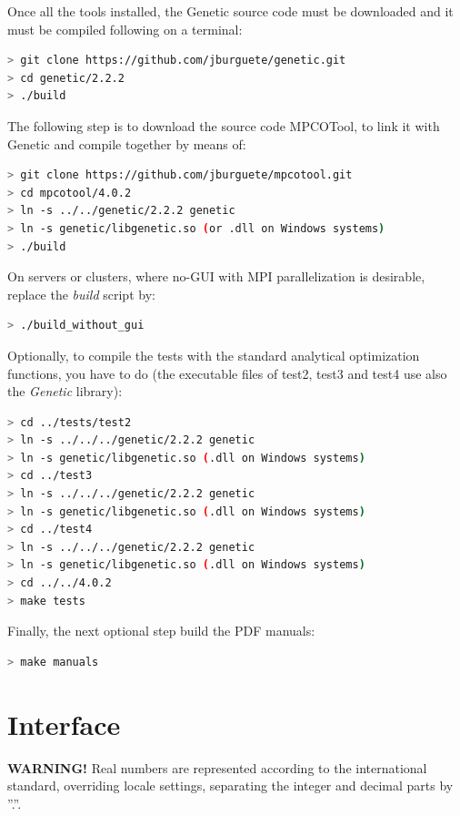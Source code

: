 \documentclass[a4paper]{report}
\begin{document}
Once all the tools installed, the Genetic source code must be downloaded and it must be compiled following on a terminal:
\begin{lstlisting}[language=bash,basicstyle=\scriptsize]
> git clone https://github.com/jburguete/genetic.git
> cd genetic/2.2.2
> ./build
\end{lstlisting}

The following step is to download the source code MPCOTool, to link it with Genetic and compile together by means of:
\begin{lstlisting}[language=bash,basicstyle=\scriptsize]
> git clone https://github.com/jburguete/mpcotool.git
> cd mpcotool/4.0.2
> ln -s ../../genetic/2.2.2 genetic
> ln -s genetic/libgenetic.so (or .dll on Windows systems)
> ./build
\end{lstlisting}

On servers or clusters, where no-GUI with MPI parallelization is desirable,
replace the \emph{build} script by:
\begin{lstlisting}[language=bash,basicstyle=\scriptsize]
> ./build_without_gui
\end{lstlisting}
 
Optionally, to compile the tests with the standard analytical optimization
functions, you have to do (the executable files of test2, test3 and test4 use
also the \emph{Genetic} library):
\begin{lstlisting}[language=bash,basicstyle=\scriptsize]
> cd ../tests/test2
> ln -s ../../../genetic/2.2.2 genetic
> ln -s genetic/libgenetic.so (.dll on Windows systems)
> cd ../test3
> ln -s ../../../genetic/2.2.2 genetic
> ln -s genetic/libgenetic.so (.dll on Windows systems)
> cd ../test4
> ln -s ../../../genetic/2.2.2 genetic
> ln -s genetic/libgenetic.so (.dll on Windows systems)
> cd ../../4.0.2
> make tests
\end{lstlisting}

Finally, the next optional step build the PDF manuals:
\begin{lstlisting}[language=bash,basicstyle=\scriptsize]
> make manuals
\end{lstlisting}

\chapter{Interface}

{\bf WARNING!} Real numbers are represented according to the international
standard, overriding locale settings, separating the integer and decimal parts
by ''.''.
\end{document}
